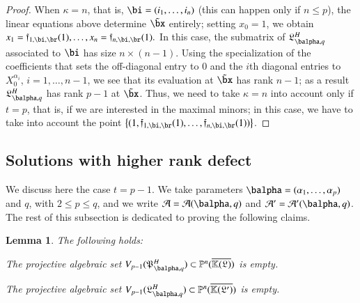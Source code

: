 \documentclass[amsthm]{elsart}
\newtheorem{lemma}[definition]{Lemma}
\begin{document}
\begin{proof}
  When $\kappa=n$, that is, $\bi=(i_1,\dots,i_n)$ (this can happen
  only if $n \le p$), the linear equations above determine $\tilde\bx$
  entirely; setting $x_0=1$, we obtain
  $x_{1}=\mathfrak{f}_{1,\bi,\br}(1),\dots,x_{n}=\mathfrak{f}_{n,\bi,\br}(1).$
  In this case, the submatrix of $\mathfrak{L}^H_{\balpha,q}$
  associated to $\bi$ has size $n \times (n-1)$. Using the
  specialization of the coefficients that sets the off-diagonal entry
  to $0$ and the $i$th diagonal entries to $X_0^{\alpha_i}$,
  $i=1,\dots,n-1$, we see that its evaluation at $\tilde\bx$ has rank
  $n-1$; as a result $\mathfrak{L}^H_{\balpha,q}$ has rank $p-1$ at
  $\tilde \bx$. Thus, we need to take $\kappa=n$ into account only if
  $t=p$, that is, if we are interested in the maximal minors; in this
  case, we have to take into account the point $\left \{
  (1,\mathfrak{f}_{1,\bi,\br}(1),\dots,\mathfrak{f}_{n,\bi,\br}(1))\right
  \}$.
\end{proof}


\subsection{Solutions with higher rank defect} 

We discuss here the case $t=p-1$.  We take parameters
$\balpha=(\alpha_1,\dots,\alpha_p)$ and $q$, with $2 \le p \le q$, and
we write ${\cal A}={\cal A}(\balpha,q)$ and ${\cal A}'={\cal
  A}'(\balpha,q)$.  The rest of this subsection is dedicated to
proving the following claims.

\begin{lemma} The following holds:
\begin{description}[leftmargin=*]
\item[$\assI_1(\balpha,q).$] The projective algebraic set
  $V_{p-1}(\mathfrak{P}^H_{\balpha,q})\subset\P^n(\KKGbar)$ is empty.
\item[$\assJ_1(\balpha,q).$] The projective algebraic set
  $V_{p-1}(\mathfrak{L}^H_{\balpha,q})\subset\P^n(\KKGpbar)$ is empty.
\end{description}
\end{lemma}
\end{document}
